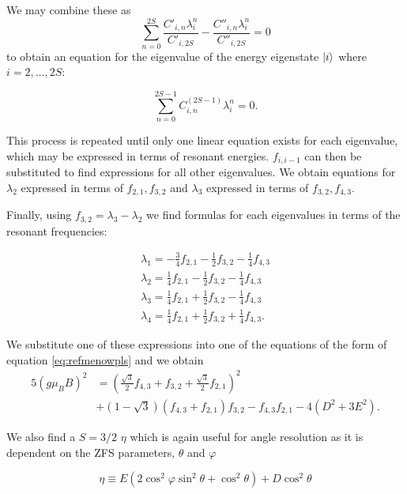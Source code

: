 We may combine these as
$$\sum_{n=0}^{2S} \frac{C'_{i,n}\lambda_i^n}{C'_{i,2S}}-\frac{C''_{i,n} \lambda_i^n}{C''_{i, 2S}} = 0$$
to obtain an equation for the eigenvalue of the energy eigenstate $\ket{i}$ where $i = 2, \dots, 2S$:

\begin{equation}
	\sum_{n=0}^{2S -1} C_{i,n}^{(2S-1)} \lambda_i^n = 0.
	\label{eq:refmenowpls}
\end{equation}

This process is repeated until only one linear equation exists for each eigenvalue, which may be expressed in terms of resonant energies. $f_{i, i-1}$ can then be substituted to find expressions for all other eigenvalues.
We
obtain equations for $\lambda_2$ expressed in terms of $f_{2,1}, f_{3,2}$ and $\lambda_3$ expressed in terms of $f_{3,2}, f_{4,3}$.

Finally, using $f_{3,2} = \lambda_3 - \lambda_2$ we find formulas for each eigenvalues in terms of the resonant frequencies:

\begin{eqnarray}
	\lambda_1 = -\frac{3}{4}f_{2,1} - \frac{1}{2} f_{3,2} - \frac{1}{4} f_{4,3}\\
	\lambda_2 = \frac{1}{4}f_{2,1} - \frac{1}{2}f_{3,2} - \frac{1}{4} f_{4,3} \\
	\lambda_3 = \frac{1}{4}f_{2,1} + \frac{1}{2}f_{3,2} - \frac{1}{4} f_{4,3} \\
	\lambda_4 = \frac{1}{4}f_{2,1} + \frac{1}{2}f_{3,2} + \frac{1}{4} f_{4,3}.
\end{eqnarray}

We substitute one of these expressions into one of the equations of the form of equation \eqref{eq:refmenowpls} and we obtain
\begin{equation}
	\begin{align}
		5(g\mu_B B)^2 & =\left(\frac{\sqrt{3}}{2}f_{4,3} + f_{3,2}  + \frac{\sqrt{3}}{2}f_{2,1}\right)^2 \\
		              & +(1 - \sqrt{3}) (f_{4,3} + f_{2,1})f_{3,2} - f_{4,3}f_{2,1} - 4(D^2 + 3E^2).
	\end{align}
	\label{eq:V2_magnitude}
\end{equation}

We also find a $S=3/2$ $\eta$ which is again useful for angle resolution as it is dependent on the ZFS parameters, $\theta$ and $\varphi$

\begin{equation}
	\eta \equiv E(2\cos^2\varphi \sin^2 \theta + \cos^2\theta) + D\cos^2 \theta
	\label{eq:eta}
\end{equation}

